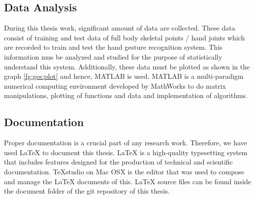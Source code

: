 \subsection{Data Analysis} During this thesis work, significant amount of data are collected. These data consist of training and test data of full body skeletal points / hand joints which are recorded to train and test the hand gesture recognition system. This information mus be analyzed and studied for the purpose of statistically understand this system. Additionally, these data must be plotted as shown in the graph \ref{fg:ges:plot} and hence, MATLAB is used. MATLAB is a multi-paradigm numerical computing environment developed by MathWorks to do matrix manipulations, plotting of functions and data and implementation of algorithms. 

\subsection{Documentation} Proper documentation is a crucial part of any research work. Therefore, we have used LaTeX to document this thesis. LaTeX is a high-quality typesetting system that includes features designed for the production of technical and scientific documentation. TeXstudio on Mac OSX is the editor that was used to compose and manage the LaTeX documents of this. LaTeX source files can be found inside the document folder of the git repository of this thesis.